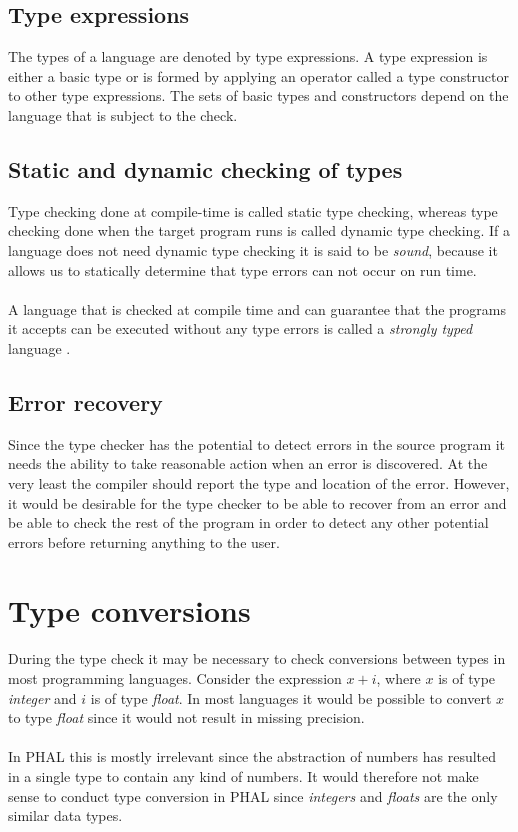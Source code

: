 \subsection*{Type expressions}
The types of a language are denoted by type expressions. 
A type expression is either a basic type or is formed by applying an operator called a type constructor to other type expressions. 
The sets of basic types and constructors depend on the language that is subject to the check. 

\subsection*{Static and dynamic checking of types}
Type checking done at compile-time is called static type checking, whereas type checking done when the target program runs is called dynamic type checking.
If a language does not need dynamic type checking it is said to be \textit{sound}, because it allows us to statically determine that type errors can not occur on run time. 
\\\\
A language that is checked at compile time and can guarantee that the programs it accepts can be executed without any type errors is called a \textit{strongly typed} language \cite{Dragon}.

\subsection*{Error recovery}
Since the type checker has the potential to detect errors in the source program it needs the ability to take reasonable action when an error is discovered. At the very least the compiler should report the type and location of the error. However, it would be desirable for the type checker to be able to recover from an error and be able to check the rest of the program in order to detect any other potential errors before returning anything to the user.

\section{Type conversions}
During the type check it may be necessary to check conversions between types in most programming languages. 
Consider the expression $x+i$, where $x$ is of type \textit{integer} and $i$ is of type \textit{float}. In most languages it would be possible to convert $x$ to type \textit{float} since it would not result in missing precision.
\\\\
In PHAL this is mostly irrelevant since the abstraction of numbers has resulted in a single type to contain any kind of numbers. 
It would therefore not make sense to conduct type conversion in PHAL since \textit{integers} and \textit{floats} are the only similar data types.

